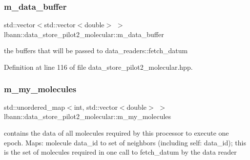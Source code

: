 \mbox{\label{classlbann_1_1data__store__pilot2__molecular_aad14735a82ce4cdcb153fcca94cd2b41}} 
\subsubsection{\texorpdfstring{m\+\_\+data\+\_\+buffer}{m\_data\_buffer}}
{\footnotesize\ttfamily std\+::vector$<$std\+::vector$<$double$>$ $>$ lbann\+::data\+\_\+store\+\_\+pilot2\+\_\+molecular\+::m\+\_\+data\+\_\+buffer\hspace{0.3cm}{\ttfamily [protected]}}



the buffers that will be passed to data\+\_\+readers\+::fetch\+\_\+datum 



Definition at line 116 of file data\+\_\+store\+\_\+pilot2\+\_\+molecular.\+hpp.

\mbox{\label{classlbann_1_1data__store__pilot2__molecular_a67fb9174cecff931f61e7f6ca000315b}} 
\subsubsection{\texorpdfstring{m\+\_\+my\+\_\+molecules}{m\_my\_molecules}}
{\footnotesize\ttfamily std\+::unordered\+\_\+map$<$int, std\+::vector$<$double$>$ $>$ lbann\+::data\+\_\+store\+\_\+pilot2\+\_\+molecular\+::m\+\_\+my\+\_\+molecules\hspace{0.3cm}{\ttfamily [protected]}}

contains the data of all molecules required by this processor to execute one epoch. Maps\+: molecule data\+\_\+id to set of neighbors (including self\+: data\+\_\+id); this is the set of molecules required in one call to fetch\+\_\+datum by the data reader 

